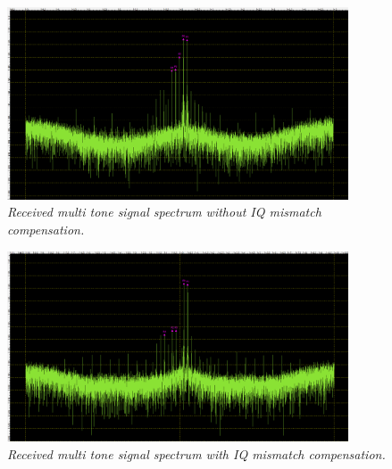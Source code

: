 \documentclass[en,printmode]{mgr}
\begin{document}
   		 	\begin{figure}[!htb]
    			\centering
   				\includegraphics[width=0.9\textwidth]{plots/real_multi_off.png}
   		 		\caption{\textit{Received multi tone signal spectrum without IQ mismatch compensation.}}
   		 	\end{figure}
   		 	\begin{figure}[!htb]
    			\centering
   				\includegraphics[width=0.9\textwidth]{plots/real_multi_on.png}
   		 		\caption{\textit{Received multi tone signal spectrum with IQ mismatch compensation.}}
   		 	\end{figure}
   		 	
\end{document}
